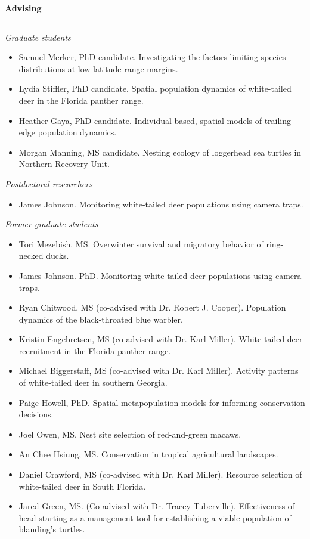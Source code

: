 {\large \bf Advising} \\
\rule[3mm]{\textwidth}{0.3mm}

{\it Graduate students}
\begin{itemize}
  \item Samuel Merker, PhD candidate. Investigating the factors
    limiting species distributions at low latitude range margins. 
  \item Lydia Stiffler, PhD candidate. Spatial population dynamics of
    white-tailed deer in the Florida panther range.
  \item Heather Gaya, PhD candidate. Individual-based, spatial models
    of trailing-edge population dynamics.
  \item Morgan Manning, MS candidate. Nesting ecology of loggerhead
    sea turtles in Northern Recovery Unit.
\end{itemize}

{\it Postdoctoral researchers}
\begin{itemize}
   \item James Johnson. Monitoring white-tailed deer
     populations using camera traps. 
\end{itemize}


{\it Former graduate students}
\begin{itemize}
  \item Tori Mezebish. MS. Overwinter survival and migratory
    behavior of ring-necked ducks.
   \item James Johnson. PhD. Monitoring white-tailed deer
     populations using camera traps. 
  \item Ryan Chitwood, MS (co-advised with Dr. Robert
    J. Cooper). Population dynamics of the black-throated blue warbler. 
  \item Kristin Engebretsen, MS (co-advised with Dr. Karl
    Miller). White-tailed deer recruitment in the Florida panther
    range.
  \item Michael Biggerstaff, MS (co-advised with Dr. Karl
    Miller). Activity patterns of white-tailed deer in southern Georgia. 
  \item Paige Howell, PhD. Spatial metapopulation models for 
    informing conservation decisions.
  \item Joel Owen, MS. Nest site selection of red-and-green macaws. 
  \item An Chee Hsiung, MS. Conservation in tropical agricultural landscapes.
  \item Daniel Crawford, MS (co-advised with Dr. Karl
    Miller). Resource selection of white-tailed deer in South
    Florida.
  \item Jared Green, MS. (Co-advised with Dr. Tracey
    Tuberville). Effectiveness of head-starting as a management tool
    for establishing a viable population of blanding's turtles. 
\end{itemize}

